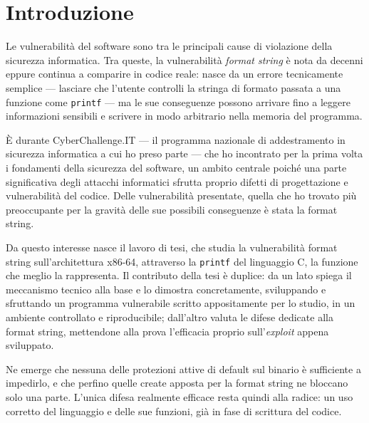 \chapter*{Introduzione} %

Le vulnerabilità del software sono tra le principali cause di violazione della sicurezza informatica. Tra queste, la vulnerabilità \emph{format string} è nota da decenni eppure continua a comparire in codice reale: nasce da un errore tecnicamente semplice --- lasciare che l'utente controlli la stringa di formato passata a una funzione come \texttt{printf} --- ma le sue conseguenze possono arrivare fino a leggere informazioni sensibili e scrivere in modo arbitrario nella memoria del programma.

È durante CyberChallenge.IT --- il programma nazionale di addestramento in sicurezza informatica a cui ho preso parte --- che ho incontrato per la prima volta i fondamenti della sicurezza del software, un ambito centrale poiché una parte significativa degli attacchi informatici sfrutta proprio difetti di progettazione e vulnerabilità del codice. Delle vulnerabilità presentate, quella che ho trovato più preoccupante per la gravità delle sue possibili conseguenze è stata la format string.

Da questo interesse nasce il lavoro di tesi, che studia la vulnerabilità format string sull'architettura x86-64, attraverso la \texttt{printf} del linguaggio C, la funzione che meglio la rappresenta. Il contributo della tesi è duplice: da un lato spiega il meccanismo tecnico alla base e lo dimostra concretamente, sviluppando e sfruttando un programma vulnerabile scritto appositamente per lo studio, in un ambiente controllato e riproducibile; dall'altro valuta le difese dedicate alla format string, mettendone alla prova l'efficacia proprio sull'\emph{exploit} appena sviluppato.

Ne emerge che nessuna delle protezioni attive di default sul binario è sufficiente a impedirlo, e che perfino quelle create apposta per la format string ne bloccano solo una parte. L'unica difesa realmente efficace resta quindi alla radice: un uso corretto del linguaggio e delle sue funzioni, già in fase di scrittura del codice.

